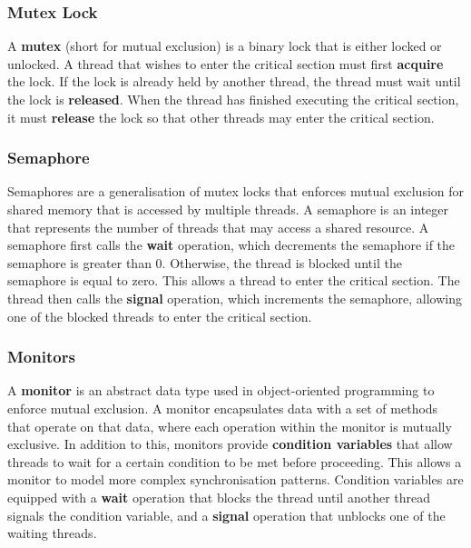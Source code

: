 \documentclass{article}
\begin{document}
\subsubsection{Mutex Lock}
A \textbf{mutex} (short for mutual exclusion) is a binary lock that is
either locked or unlocked. A thread that wishes to enter the critical
section must first \textbf{acquire} the lock. If the lock is already
held by another thread, the thread must wait until the lock is
\textbf{released}. When the thread has finished executing the critical
section, it must \textbf{release} the lock so that other threads may
enter the critical section.
\subsubsection{Semaphore}
Semaphores are a generalisation of mutex locks that enforces mutual
exclusion for shared memory that is accessed by multiple threads. A
semaphore is an integer that represents the number of threads that may
access a shared resource. A semaphore first calls the \textbf{wait}
operation, which decrements the semaphore if the semaphore is greater
than 0. Otherwise, the thread is blocked until the semaphore is equal
to zero. This allows a thread to enter the critical section. The thread
then calls the \textbf{signal} operation, which increments the
semaphore, allowing one of the blocked threads to enter the critical
section.
\subsubsection{Monitors}
A \textbf{monitor} is an abstract data type used in object-oriented
programming to enforce mutual exclusion. A monitor encapsulates data
with a set of methods that operate on that data, where each operation
within the monitor is mutually exclusive. In addition to this, monitors
provide \textbf{condition variables} that allow threads to wait for a
certain condition to be met before proceeding. This allows a monitor to
model more complex synchronisation patterns. Condition variables are
equipped with a \textbf{wait} operation that blocks the thread until
another thread signals the condition variable, and a \textbf{signal}
operation that unblocks one of the waiting threads.
\end{document}
